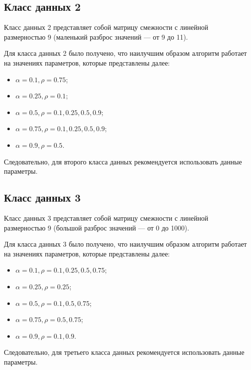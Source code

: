 

\subsection{Класс данных 2}\label{par:class2}
Класс данных 2 представляет собой матрицу смежности с линейной размерностью 9 (маленький разброс значений --- от 9 до 11).

Для класса данных 2 было получено, что наилучшим образом алгоритм работает на значениях параметров, которые представлены далее:
\begin{itemize}[label=---]
	\item $\alpha = 0.1, \rho = 0.75$;
	\item $\alpha = 0.25, \rho = 0.1$;
	\item $\alpha = 0.5, \rho = 0.1, 0.25, 0.5, 0.9$;
	\item $\alpha = 0.75, \rho = 0.1, 0.25, 0.5, 0.9$;
	\item $\alpha = 0.9, \rho = 0.5$.
\end{itemize} 
Следовательно, для второго класса данных рекомендуется использовать данные параметры.

\subsection{Класс данных 3}
Класс данных 3 представляет собой матрицу смежности с линейной размерностью 9 (большой разброс значений --- от 0 до 1000).

Для класса данных 3 было получено, что наилучшим образом алгоритм работает на значениях параметров, которые представлены далее:
\begin{itemize}[label=---]
	\item $\alpha = 0.1, \rho = 0.1, 0.25, 0.5, 0.75$;
	\item $\alpha = 0.25, \rho = 0.25$;
	\item $\alpha = 0.5, \rho = 0.1, 0.5, 0.75$;
	\item $\alpha = 0.75, \rho = 0.5, 0.75$;
	\item $\alpha = 0.9, \rho = 0.1, 0.9$.
\end{itemize} 
Следовательно, для третьего класса данных рекомендуется использовать данные параметры.
